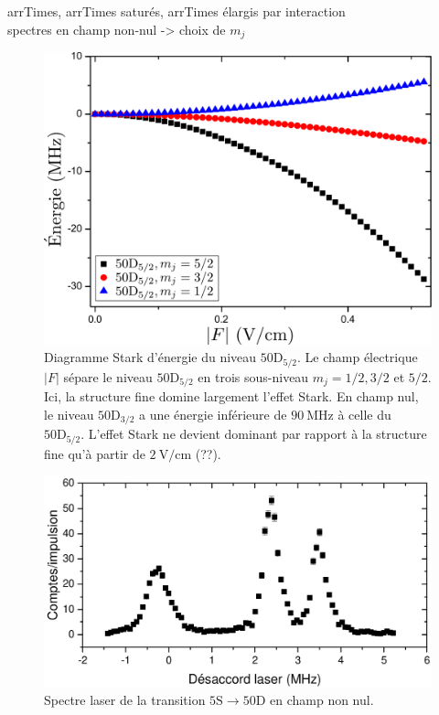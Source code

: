 		\noindent arrTimes, arrTimes saturés, arrTimes élargis par interaction \\
		
		\noindent spectres en champ non-nul -> choix de $m_j$ \\
		
\begin{figure}[!h]
\centering
\includegraphics[width=0.7\linewidth]{figures/circulars/Stark50D5_2}
\caption[Diagramme Stark d'énergie du niveau $\mathrm{50D_{5/2}}$]{
Diagramme Stark d'énergie du niveau $\mathrm{50D_{5/2}}$.
Le champ électrique $|F|$ sépare le niveau $\mathrm{50D_{5/2}}$ en trois sous-niveau $m_j=1/2,3/2$ et $5/2$.
Ici, la structure fine domine largement l'effet Stark.
En champ nul, le niveau $\mathrm{50D_{3/2}}$ a une énergie inférieure de $\SI{90}{\MHz}$ à celle du $\mathrm{50D_{5/2}}$.
L'effet Stark ne devient dominant par rapport à la structure fine qu'à partir de $\SI{2}{\V/\cm}$ (??).
}
\label{fig:Stark50D5_2}
\end{figure}

\begin{figure}[!h]
\centering
\includegraphics[width=0.85\linewidth]{figures/circulars/spectre_laser_champ}
\caption[Spectre laser de la transition $\mathrm{5S\rightarrow 50D}$ en champ non nul]{
Spectre laser de la transition $\mathrm{5S\rightarrow 50D}$ en champ non nul.
}
\label{fig:spectre_laser_champ}
\end{figure}
		


